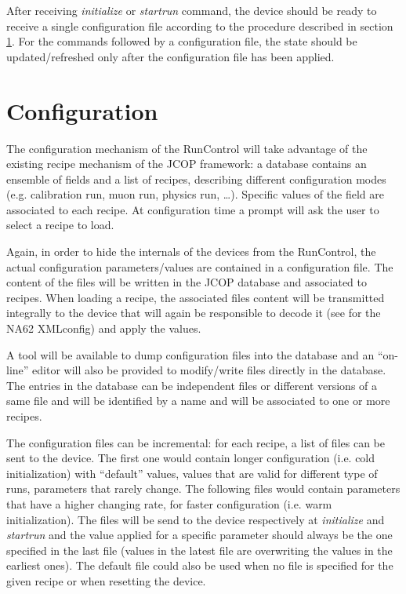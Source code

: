 \documentclass[a4paper]{article}
\begin{document}
After receiving \textit{initialize} or \textit{startrun} command, the device
should be ready to receive a single configuration file according to the
procedure described in section \ref{sec:configuration}. For the commands followed by a configuration
file, the state should be updated/refreshed only after the configuration file has been applied.

\section{Configuration}\label{sec:configuration}
The configuration mechanism of the RunControl will take advantage of the existing recipe mechanism
of the JCOP\cite{biblio:JCOP} framework: a database contains an ensemble of fields and a list of
recipes, describing different configuration modes (e.g. calibration run, muon
run, physics run, \ldots). Specific values of the field are associated to each
recipe. At configuration time a prompt will ask the user to select a recipe to load.

Again, in order to hide the internals of the devices from the RunControl, the actual configuration
parameters/values are contained in a configuration file. The content of the files will be written in
the JCOP database and associated to recipes. When loading a recipe, the associated files content
will be transmitted integrally to the device that will again be responsible to
decode it (see \cite{biblio:XMLProxy} for the NA62 XMLconfig) and apply the
values.

A tool will be available to dump configuration files into the database and an ``on-line'' editor will
also be provided to modify/write files directly in the database. The entries in the database can be
independent files or different versions of a same file and will be identified by a name and will
be associated to one or more recipes.

The configuration files can be incremental: for each recipe, a list of files can be sent to the
device. The first one would contain longer configuration (i.e. cold
initialization) with ``default'' values, values that are valid for different
type of runs, parameters that rarely change. The following files would contain
parameters that have a higher changing rate, for faster configuration (i.e.
warm initialization). The files will be send to the device respectively at
\textit{initialize} and \textit{startrun} and the value applied for a specific
parameter should always be the one specified in the last file (values in the
latest file are overwriting the values in the earliest ones). The default file
could also be used when no file is specified for the given recipe or when
resetting the device.
\end{document}
